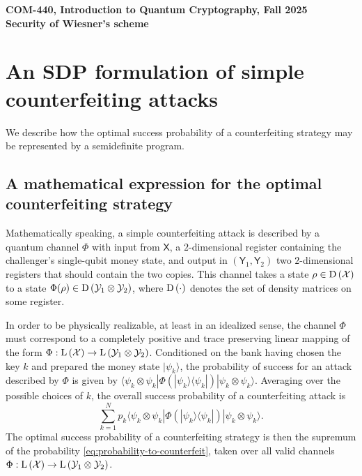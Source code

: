 \documentclass[11pt, letterpaper]{article}
\theoremstyle{remark}
\theoremstyle{definition}
\numberwithin{equation}{section}
\newcommand{\setft}[1]{\textnormal{#1}}
\newcommand{\1}{\mathbb{1}}
\newcommand{\ket}[1]{|#1\rangle}
\newcommand{\bra}[1]{\langle#1|}
\newcommand{\density}[1]{\setft{D}\left(#1\right)}
\newcommand{\lin}[1]{\setft{L}\left(#1\right)}
\newcommand{\reg}[1]{\mathsf{#1}}
\def\X{\mathcal{X}}
\def\Y{\mathcal{Y}}
\newcommand{\Header}[1]{\begin{center} {\Large\bf #1} \end{center}}
\begin{document}
\Header{COM-440, Introduction to Quantum Cryptography, Fall 2025 \\[3mm] \large Security of Wiesner's scheme}


\section{An SDP formulation of simple counterfeiting
  attacks \label{sec:counterfeit-sdp}} 

We describe how the optimal success probability of a counterfeiting
strategy may be represented by a
semidefinite program.

\subsection{A mathematical expression for the optimal counterfeiting strategy}

Mathematically speaking, a simple counterfeiting attack is described
by a quantum channel $\Phi$  with input from $\reg{X}$, a $2$-dimensional register containing the challenger's single-qubit money state,
and output in $(\reg{Y}_1,\reg{Y}_2)$ two $2$-dimensional registers that should contain the two copies. This channel takes a state
$\rho\in\density{\X}$ to a state
$\Phi(\rho)\in\density{\Y_1\otimes\Y_2}$, where $\density{\cdot}$ denotes the set of density matrices on some register.

In order to be physically realizable, at least in an idealized sense,
the channel $\Phi$ must correspond to a completely positive and trace
preserving linear mapping of the form 
$\Phi: \lin{\X}\rightarrow\lin{\Y_1\otimes\Y_2}$.
Conditioned on the bank having chosen the key $k$ and prepared the money state $\ket{\psi_k}$, the probability of
success for an attack described by $\Phi$ is given by
$\bra{\psi_k \otimes \psi_k} \Phi(\ket{\psi_k}\bra{\psi_k})
\ket{\psi_k\otimes\psi_k}$.
Averaging over the possible choices of $k$, 
 the overall success probability of a counterfeiting
attack is
\begin{equation} 
  \label{eq:probability-to-counterfeit}
  \sum_{k = 1}^N p_k
  \bra{\psi_k \otimes \psi_k} \Phi(\ket{\psi_k}\bra{\psi_k})
  \ket{\psi_k\otimes\psi_k}.
\end{equation}
The optimal success probability of a counterfeiting
strategy is then the supremum of the probability
\eqref{eq:probability-to-counterfeit}, taken over all valid channels $\Phi:
\lin{\X}\rightarrow\lin{\Y_1\otimes\Y_2}$.
\end{document}
